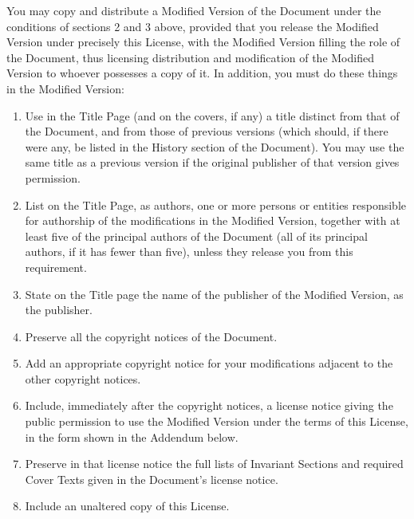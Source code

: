 \documentclass[letterpaper,10pt,english]{sphinxmanual}
\begin{document}
\sphinxAtStartPar
You may copy and distribute a Modified Version of the Document under the conditions of sections 2 and 3 above, provided that you release the Modified Version under precisely this License, with the Modified Version filling the role of the Document, thus licensing distribution and modification of the Modified Version to whoever possesses a copy of it. In addition, you must do these things in the Modified Version:
\begin{enumerate}
%
\item {} 
\sphinxAtStartPar
Use in the Title Page (and on the covers, if any) a title distinct from that of the Document, and from those of previous versions (which should, if there were any, be listed in the History section of the Document). You may use the same title as a previous version if the original publisher of that version gives permission.

\item {} 
\sphinxAtStartPar
List on the Title Page, as authors, one or more persons or entities responsible for authorship of the modifications in the Modified Version, together with at least five of the principal authors of the Document (all of its principal authors, if it has fewer than five), unless they release you from this requirement.

\item {} 
\sphinxAtStartPar
State on the Title page the name of the publisher of the Modified Version, as the publisher.

\item {} 
\sphinxAtStartPar
Preserve all the copyright notices of the Document.

\item {} 
\sphinxAtStartPar
Add an appropriate copyright notice for your modifications adjacent to the other copyright notices.

\item {} 
\sphinxAtStartPar
Include, immediately after the copyright notices, a license notice giving the public permission to use the Modified Version under the terms of this License, in the form shown in the Addendum below.

\item {} 
\sphinxAtStartPar
Preserve in that license notice the full lists of Invariant Sections and required Cover Texts given in the Document’s license notice.

\item {} 
\sphinxAtStartPar
Include an unaltered copy of this License.


\end{enumerate}
\end{document}

